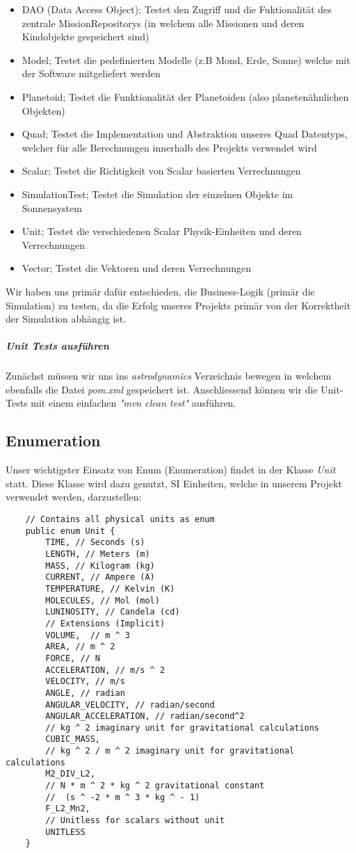 \begin{itemize}
	\item DAO (Data Access Object); Testet den Zugriff und die Fuktionalität des zentrale MissionRepositorys (in welchem alle Missionen und deren Kindobjekte gespeichert sind)
	\item Model; Testet die pedefinierten Modelle (z.B Mond, Erde, Sonne) welche mit der Software mitgeliefert werden
	\item Planetoid; Testet die Funktionalität der Planetoiden (also planetenähnlichen Objekten)
	\item Quad; Testet die Implementation und Abstraktion unseres Quad Datentyps, welcher für alle Berechnungen innerhalb des Projekts verwendet wird
	\item Scalar; Testet die Richtigkeit von Scalar basierten Verrechnungen
	\item SimulationTest; Testet die Simulation der einzelnen Objekte im Sonnensystem
	\item Unit; Testet die verschiedenen Scalar Physik-Einheiten und deren Verrechnungen
	\item Vector; Testet die Vektoren und deren Verrechnungen
\end{itemize}

Wir haben uns primär dafür entschieden, die Business-Logik (primär die Simulation) zu testen, da die Erfolg unseres Projekts primär von der Korrektheit der Simulation abhängig ist.

\subparagraph{Unit Tests ausführen}

Zunächst müssen wir uns ins \textit{astrodynamics} Verzeichnis bewegen in welchem ebenfalls die Datei \textit{pom.xml} gespeichert ist.
Anschliessend können wir die Unit-Tests mit einem einfachen \textit{"mvn clean test"} ausführen.

\subsection{Enumeration}

Unser wichtigster Einsatz von Enum (Enumeration) findet in der Klasse \textit{Unit} statt. Diese Klasse wird dazu genutzt, SI Einheiten, welche in unserem Projekt verwendet werden, darzustellen:

\begin{lstlisting}
	// Contains all physical units as enum
	public enum Unit {
		TIME, // Seconds (s)
		LENGTH, // Meters (m)
		MASS, // Kilogram (kg)
		CURRENT, // Ampere (A)
		TEMPERATURE, // Kelvin (K)
		MOLECULES, // Mol (mol)
		LUNINOSITY, // Candela (cd)
		// Extensions (Implicit)
		VOLUME,  // m ^ 3
		AREA, // m ^ 2
		FORCE, // N
		ACCELERATION, // m/s ^ 2
		VELOCITY, // m/s
		ANGLE, // radian
		ANGULAR_VELOCITY, // radian/second
		ANGULAR_ACCELERATION, // radian/second^2
		// kg ^ 2 imaginary unit for gravitational calculations
		CUBIC_MASS, 
		// kg ^ 2 / m ^ 2 imaginary unit for gravitational calculations
		M2_DIV_L2,
		// N * m ^ 2 * kg ^ 2 gravitational constant
		//  (s ^ -2 * m ^ 3 * kg ^ - 1) 
		F_L2_Mn2,
		// Unitless for scalars without unit
		UNITLESS
	}
\end{lstlisting}

